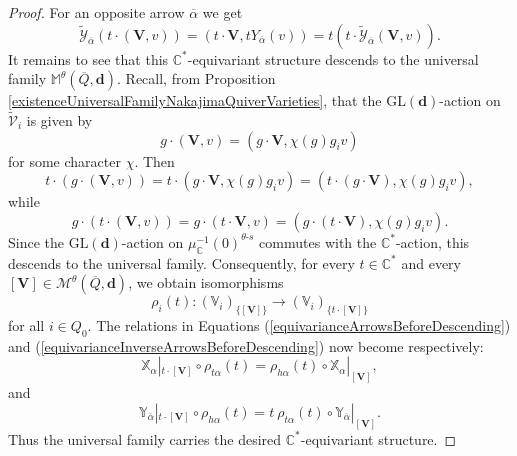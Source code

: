 \documentclass[10pt,a4paper]{amsart}
\begin{document}
\begin{proof}
		For an opposite arrow $\overline{\alpha}$ we get
		\begin{equation}\label{equivarianceInverseArrowsBeforeDescending}
			\widetilde{\mathcal{Y}}_{\overline\alpha}(t\cdot(\mathbf{V},v))= (t\cdot \mathbf{V},tY_{\overline{\alpha}}(v))
			=t(t\cdot\widetilde{\mathcal{Y}}_{\overline{\alpha}}(\mathbf{V},v)).
		\end{equation}
		It remains to see that this \(\mathbb C^*\)-equivariant structure descends
		to the universal family $\mathbb{M}^{\theta}(\overline{Q},\mathbf{d})$. Recall, from Proposition \ref{existenceUniversalFamilyNakajimaQuiverVarieties}, that the $\text{GL}(\mathbf{d})$-action on $\widetilde{\mathcal{V}}_i$ is given by
		$$
		g\cdot(\mathbf{V},v)=(g\cdot \mathbf{V},\chi(g)g_i v)
		$$
		for some character $\chi$. Then
		$$
		t\cdot(g\cdot(\mathbf{V},v))=t\cdot(g\cdot \mathbf{V},\chi(g)g_i v)=
		(t\cdot(g\cdot \mathbf{V}),\chi(g)g_i v),
		$$
		while
		$$
		g\cdot(t\cdot(\mathbf{V},v))=
		g\cdot(t\cdot \mathbf{V},v)=
		(g\cdot(t\cdot \mathbf{V}),\chi(g)g_i v).
		$$
		Since the $\text{GL}(\mathbf{d})$-action on $\mu^{-1}_{\mathbb{C}}(0)^{\theta\text{-}s}$ commutes with the
		$\mathbb C^*$-action, this descends to the universal family. 
		Consequently, for every $t\in\mathbb{C}^*$ and every
		$[\mathbf{V}]\in \mathcal{M}^{\theta}(\overline{Q},\mathbf{d})$, we obtain isomorphisms
		$$
		\rho_i(t):
		(\mathbb{V}_i)_{\{[\mathbf{V}]\}}
		\to
		(\mathbb{V}_i)_{\{t\cdot[\mathbf{V}]\}}
		$$
		for all $i\in Q_0$. The relations in Equations (\ref{equivarianceArrowsBeforeDescending}) and (\ref{equivarianceInverseArrowsBeforeDescending}) now become respectively:
		$$
		\mathbb{X}_{\alpha}|_{t\cdot[\mathbf{V}]}
		\circ \rho_{t\alpha}(t)=\rho_{h\alpha}(t)\circ \mathbb{X}_{\alpha}|_{[\mathbf{V}]},
		$$
		and
		$$
		\mathbb{Y}_{\overline\alpha}|_{t\cdot[\mathbf{V}]}
		\circ \rho_{h\alpha}(t)=
		t\ 
		\rho_{t\alpha}(t)
		\circ \mathbb{Y}_{\overline\alpha}|_{[\mathbf{V}]}.
		$$
		Thus the universal family carries the desired
		\(\mathbb C^*\)-equivariant structure.
	\end{proof}
\end{document}
